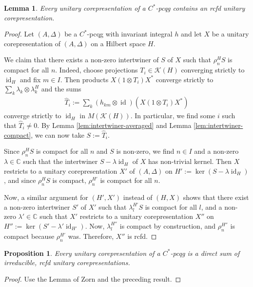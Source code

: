 \documentclass[11pt]{article}
\DeclareMathOperator{\id}{id}
\newcommand{\C}{\mathbb{C}}
\newtheorem{Lem}[Theorem]{Lemma}
\newtheorem{Prop}[Theorem]{Proposition}
\theoremstyle{definition}
\numberwithin{equation}{section}
\begin{document}
\begin{Lem} \label{lem:intertwiner-rcfd}
Every unitary corepresentation of a  $C^{*}$-pcqg contains an rcfd unitary
corepresentation.
\end{Lem}
\begin{proof}
  Let $(A,\Delta)$ be a $C^{*}$-pcqg with invariant integral $h$ and
  let $X$ be a unitary corepresentation of $(A,\Delta)$ on a Hilbert
  space $H$.

  We claim that there exists a non-zero intertwiner of $S$ of $X$ such
  that $\rho^{H}_{n}S$ is compact for all $n$.  Indeed, choose
  projections $T_{i} \in \mathcal{K}(H)$ converging strictly to
  $\id_{H}$ and fix $m\in I$. Then products $X(1\otimes T_{i})X^{*}$
  converge strictly to $\sum_{k} \lambda_{k} \otimes \lambda_{k}^{H}$
  and the sums
  \begin{align*}
    \hat T_{i} := \sum_{k}(h_{km} \otimes \id)(X(1\otimes T_{i})X^{*})
  \end{align*}
  converge strictly to $\id_{H}$ in $M(\mathcal{K}(H))$. In
  particular, we find some $i$ such that $\hat T_{i}\neq 0$.  By Lemma 
  \ref{lem:intertwiner-averaged} and  Lemma
  \ref{lem:intertwiner-compact}, we can now take $S:=\hat T_{i}$.

  Since $\rho^{H}_{n}S$ is compact for all $n$ and $S$ is non-zero, we
  find $n \in I$ and a non-zero $\lambda\in \C$ such that the
  intertwiner $S-\lambda\id_{H}$ of $X$ has non-trivial kernel.  Then
  $X$ restricts to a unitary corepresentation $X'$ of $(A,\Delta)$ on
  $H':=\ker (S-\lambda \id_{H})$, and since $\rho^{H}_{n}S$ is
  compact, $\rho^{H'}_{n}$ is compact for all $n$.


  Now, a similar argument for $(H',X')$ instead of $(H,X)$ shows that
  there exist a non-zero intertwiner $S'$ of $X'$ such that
  $\lambda^{H'}_{l}S$ is compact for all $l$, and a non-zero $\lambda'
  \in \C$ such that $X'$ restricts to a unitary corepresentation $X''$ on
  $H'':=\ker (S' - \lambda'\id_{H'})$. Now, $\lambda^{H''}_{l}$ is
  compact by construction, and $\rho^{H''}_{n}$ is compact because
  $\rho^{H'}_{n}$ was. Therefore, $X''$ is rcfd.
\end{proof}
\begin{Prop}
  Every unitary corepresentation of a $C^{*}$-pcqg is a direct sum of
  irreducible, rcfd unitary corepresentations.
\end{Prop}
\begin{proof}
  Use the Lemma of Zorn and the preceding result.
\end{proof}
\end{document}
